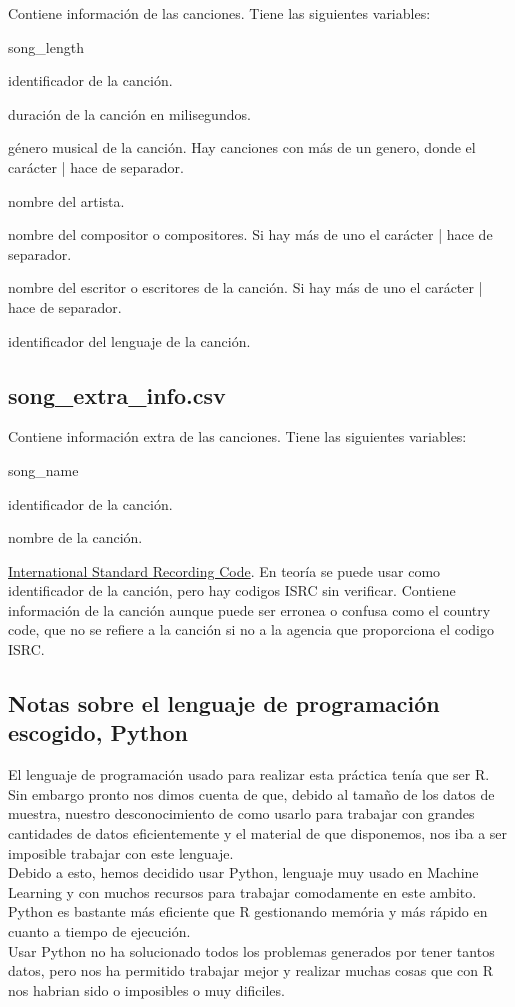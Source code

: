 \documentclass[a4paper]{article}
\begin{document}
Contiene información de las canciones. Tiene las siguientes variables:
\begin{labeling}{song\_length}
\item [song\_id] identificador de la canción.
\item [song\_length] duración de la canción en milisegundos.
\item [genre\_ids] género musical de la canción. Hay canciones con más de un genero, donde el carácter | hace de separador.
\item [artist\_name] nombre del artista.
\item [composer] nombre del compositor o compositores. Si hay más de uno el carácter | hace de separador.
\item [lyricist] nombre del escritor o escritores de la canción. Si hay más de uno el carácter | hace de separador.
\item [language] identificador del lenguaje de la canción.
\end{labeling}

\subsection*{song\_extra\_info.csv}
Contiene información extra de las canciones. Tiene las siguientes variables:
\begin{labeling}{song\_name}
\item [song\_id] identificador de la canción.
\item [song\_name] nombre de la canción.
\item [isrc] \href{https://en.wikipedia.org/wiki/International_Standard_Recording_Code}{International Standard Recording Code}. En teoría se puede usar como identificador de la canción, pero hay codigos ISRC sin verificar. Contiene información de la canción aunque puede ser erronea o confusa como el country code, que no se refiere a la canción si no a la agencia que proporciona el codigo ISRC.
\end{labeling}


\subsection{Notas sobre el lenguaje de programación escogido, Python}
El lenguaje de programación usado para realizar esta práctica tenía que ser R. Sin embargo pronto nos dimos cuenta de que, debido al tamaño de los datos de muestra, nuestro desconocimiento de como usarlo para trabajar con grandes cantidades de datos eficientemente y el material de que disponemos, nos iba a ser imposible trabajar con este lenguaje.\\
Debido a esto, hemos decidido usar Python, lenguaje muy usado en Machine Learning y con muchos recursos para trabajar comodamente en este ambito. Python es bastante más eficiente que R gestionando memória y más rápido en cuanto a tiempo de ejecución.\\
Usar Python no ha solucionado todos los problemas generados por tener tantos datos, pero nos ha permitido trabajar mejor y realizar muchas cosas que con R nos habrian sido o imposibles o muy dificiles.
\end{document}
